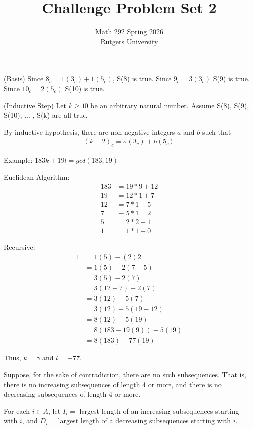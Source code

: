 \documentclass[12pt]{article}
\title{Challenge Problem Set 2}
\author{Math 292 Spring 2026 \\ Rutgers University}
\begin{document}
\maketitle

(Basis) Since $8_c = 1(3_c) + 1(5_c)$,
S(8) is true.
Since $9_c = 3(3_c)$
S(9) is true.
Since $10_c = 2(5_c)$
S(10) is true.

(Inductive Step) Let $k \geq{10}$ be an arbitrary natural number.
Assume S(8), S(9), S(10), ... , S(k) are all true.

By inductive hypothesis, there are non-negative integers $a$ and $b$ such that
\begin{align*}
    (k-2)_c = a(3_c) + b(5_c)
\end{align*}

Example: $183k +19l = gcd(183, 19)$

Euclidean Algorithm:
\begin{align*}
    183 & = 19*9 + 12  \\
    19  & = 12 * 1 + 7 \\
    12  & = 7 * 1 + 5  \\
    7   & = 5 * 1 + 2  \\
    5   & = 2 * 2 + 1  \\
    1   & = 1 * 1 + 0
\end{align*}

Recursive:
\begin{align*}
    1 & = 1(5) - (2)2         \\
      & = 1(5) - 2(7-5)       \\
      & = 3(5) - 2(7)         \\
      & = 3(12-7) - 2(7)      \\
      & = 3(12) - 5(7)        \\
      & = 3(12) -5(19-12)     \\
      & = 8(12) -5(19)        \\
      & = 8(183-19(9)) -5(19) \\
      & = 8(183) -77(19)
\end{align*}

Thus, $k = 8$ and $l = -77$.

\newpage{}

Suppose, for the sake of contradiction, there are no such subsequences.
That is, there is no increasing subsequences of length 4 or more,
and there is no decreasing subsequences of length 4 or more.

For each $i \in{A}$, let $I_i=$ largest length of an increasing subsequences starting with $i$, and
$D_i$ = largest length of a decreasing subsequences starting with $i$.
\end{document}
